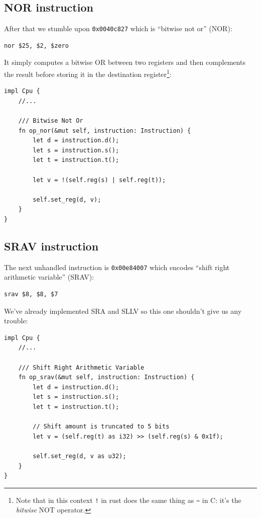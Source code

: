\documentclass[a4paper]{article}
\newcommand{\code}[1] {\texttt{#1}}
\begin{document}
\subsection{NOR instruction}

After that we stumble upon \code{0x0040c827} which is ``bitwise not
or'' (NOR):

\begin{lstlisting}[language=assembly]
nor $25, $2, $zero
\end{lstlisting}

It simply computes a bitwise OR between two registers and then
complements the result before storing it in the destination
register\footnote{Note that in this context \code{!} in rust does the
  same thing as \code{\~{}} in C: it's the \emph{bitwise} NOT
  operator.}:

\begin{lstlisting}
impl Cpu {
    //...

    /// Bitwise Not Or
    fn op_nor(&mut self, instruction: Instruction) {
        let d = instruction.d();
        let s = instruction.s();
        let t = instruction.t();

        let v = !(self.reg(s) | self.reg(t));

        self.set_reg(d, v);
    }
}
\end{lstlisting}

\subsection{SRAV instruction}

The next unhandled instruction is \code{0x00e84007} which encodes
``shift right arithmetic variable'' (SRAV):

\begin{lstlisting}[language=assembly]
srav $8, $8, $7
\end{lstlisting}

We've already implemented SRA and SLLV so this one shouldn't give us
any trouble:

\begin{lstlisting}
impl Cpu {
    //...

    /// Shift Right Arithmetic Variable
    fn op_srav(&mut self, instruction: Instruction) {
        let d = instruction.d();
        let s = instruction.s();
        let t = instruction.t();

        // Shift amount is truncated to 5 bits
        let v = (self.reg(t) as i32) >> (self.reg(s) & 0x1f);

        self.set_reg(d, v as u32);
    }
}
\end{lstlisting}
\end{document}

